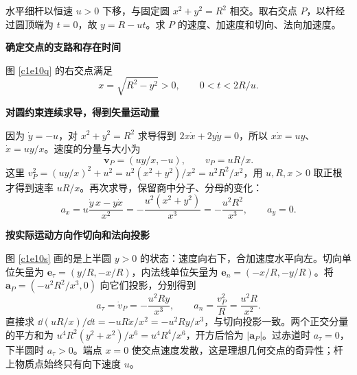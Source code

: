 \begin{question}
\begin{example}[下降直杆与圆的交点]
水平细杆以恒速 $u>0$ 下移，与固定圆 $x^2+y^2=R^2$ 相交。取右交点 $P$，以杆经过圆顶端为 $t=0$，故 $y=R-ut$。求 $P$ 的速度、加速度和切向、法向加速度。
\end{example}
\end{question}
\begin{solution}\textbf{确定交点的支路和存在时间}\par\nobreak
图 \ref{c1e10q} 的右交点满足
\[
 x=\sqrt{R^2-y^2}>0,\qquad 0<t<2R/u.
\]


\par\medskip{}\noindent\textbf{对圆约束连续求导，得到矢量运动量}\par\nobreak
因为 $\dot y=-u$，对 $x^2+y^2=R^2$ 求导得到 $2x\dot x+2y\dot y=0$，所以 $x\dot x=uy$、$\dot x=uy/x$。速度的分量与大小为
\[
 \bm v_P=(uy/x,-u),\qquad v_P=uR/x.
\]
这里 $v_P^2=(uy/x)^2+u^2=u^2(x^2+y^2)/x^2=u^2R^2/x^2$，用 $u,R,x>0$ 取正根才得到速率 $uR/x$。再次求导，保留商中分子、分母的变化：
\[
 a_x=u\frac{\dot y\,x-y\dot x}{x^2}
 =-\frac{u^2(x^2+y^2)}{x^3}
 =-\frac{u^2R^2}{x^3},\qquad a_y=0.
\]



\par\medskip{}\noindent\textbf{按实际运动方向作切向和法向投影}\par\nobreak
图 \ref{c1e10s} 画的是上半圆 $y>0$ 的状态：速度向右下，合加速度水平向左。切向单位矢量为 $\bm e_\tau=(y/R,-x/R)$，内法线单位矢量为 $\bm e_n=(-x/R,-y/R)$。将 $\bm a_P=(-u^2R^2/x^3,0)$ 向它们投影，分别得到
\[
 a_\tau=\dot v_P=-\frac{u^2Ry}{x^3},\qquad
 a_n=\frac{v_P^2}R=\frac{u^2R}{x^2}.
\]
直接求 $\dd(uR/x)/\dd t=-uR\dot x/x^2=-u^2Ry/x^3$，与切向投影一致。两个正交分量的平方和为 $u^4R^2(y^2+x^2)/x^6=u^4R^4/x^6$，开方后恰为 $|\bm a_P|$。过赤道时 $a_\tau=0$，下半圆时 $a_\tau>0$。端点 $x=0$ 使交点速度发散，这是理想几何交点的奇异性；杆上物质点始终只有向下速度 $u$。


\end{solution}

